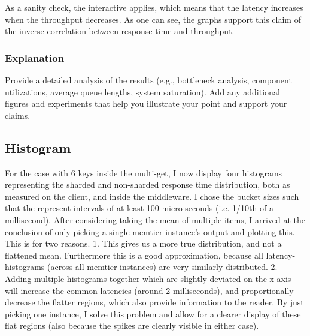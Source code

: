 \documentclass[11pt,a4paper]{article}
\begin{document}
As a sanity check, the interactive applies, which means that the latency increases when the throughput decreases.
As one can see, the graphs support this claim of the inverse correlation between response time and throughput.


\subsubsection{Explanation}

Provide a detailed analysis of the results (e.g., bottleneck analysis, component utilizations, average queue lengths, system saturation). Add any additional figures and experiments that help you illustrate your point and support your claims.

\subsection{Histogram}

For the case with 6 keys inside the multi-get, I now display four histograms representing the sharded and non-sharded response time distribution, both as measured on the client, and inside the middleware. 
I chose the bucket sizes such that the represent intervals of at least 100 micro-seconds (i.e. 1/10th of a millisecond).
After considering taking the mean of multiple items, I arrived at the conclusion of only picking a single memtier-instance's output and plotting this. 
This is for two reasons. 
1. This gives us a more true distribution, and not a flattened mean. Furthermore this is a good approximation, because all latency-histograms (across all memtier-instances) are very similarly distributed.
2. Adding multiple histograms together which are slightly deviated on the x-axis will increase the common latencies (around 2 milliseconds), and proportionally decrease the flatter regions, which also provide information to the reader.
By just picking one instance, I solve this problem and allow for a clearer display of these flat regions (also because the spikes are clearly visible in either case).
\end{document}
